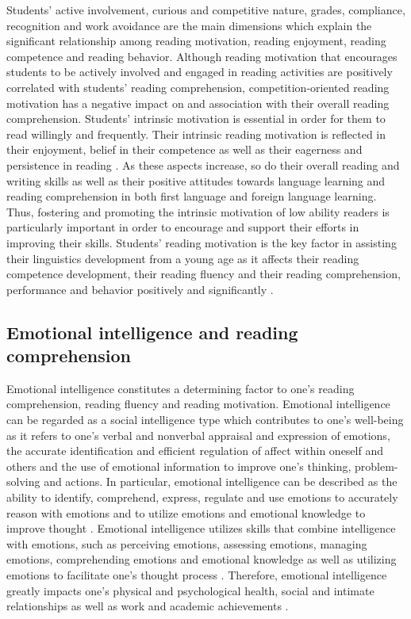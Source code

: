 \documentclass[english]{textolivre}
\begin{document}
Students’ active involvement, curious and competitive nature, grades, compliance, recognition and work avoidance are the main dimensions which explain the significant relationship among reading motivation, reading enjoyment, reading competence and reading behavior. Although reading motivation that encourages students to be actively involved and engaged in reading activities are positively correlated with students’ reading comprehension, competition-oriented reading motivation has a negative impact on and association with their overall reading comprehension. Students’ intrinsic motivation is essential in order for them to read willingly and frequently. Their intrinsic reading motivation is reflected in their enjoyment, belief in their competence as well as their eagerness and persistence in reading \cite{nevo_enhancing_2020}. As these aspects increase, so do their overall reading and writing skills as well as their positive attitudes towards language learning and reading comprehension in both first language and foreign language learning. Thus, fostering and promoting the intrinsic motivation of low ability readers is particularly important in order to encourage and support their efforts in improving their skills. Students’ reading motivation is the key factor in assisting their linguistics development from a young age as it affects their reading competence development, their reading fluency and their reading comprehension, performance and behavior positively and significantly \cite{nevo_enhancing_2020}.

\subsection{Emotional intelligence and reading comprehension}
Emotional intelligence constitutes a determining factor to one’s reading comprehension, reading fluency and reading motivation. Emotional intelligence can be regarded as a social intelligence type which contributes to one’s well-being as it refers to one’s verbal and nonverbal appraisal and expression of emotions, the accurate identification and efficient regulation of affect within oneself and others and the use of emotional information to improve one’s thinking, problem-solving and actions. In particular, emotional intelligence can be described as the ability to identify, comprehend, express, regulate and use emotions to accurately reason with emotions and to utilize emotions and emotional knowledge to improve thought \textcite{kotsou_improving_2019}. Emotional intelligence utilizes skills that combine intelligence with emotions, such as perceiving emotions, assessing emotions, managing emotions, comprehending emotions and emotional knowledge as well as utilizing emotions to facilitate one’s thought process \cite{mayer2004emotional}. Therefore, emotional intelligence greatly impacts one’s physical and psychological health, social and intimate relationships as well as work and academic achievements \cite{nelson_emotional_2011}.
\end{document}
